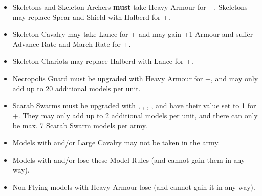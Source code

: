 \begin{itemize}
\item Skeletons and Skeleton Archers \textbf{must} take Heavy Armour for +\permodel{}. Skeletons may replace Spear and Shield with Halberd for +\permodel{}.

\item Skeleton Cavalry may take Lance for +\permodel{} and may gain +1 Armour and suffer \minuss{} Advance Rate and \minuss{} March Rate for +\permodel{}.

\item Skeleton Chariots may replace Halberd with Lance for +\permodel{}.

\item Necropolis Guard must be upgraded with Heavy Armour for +\permodel{}, and may only add up to 20 additional models per unit.

\item Scarab Swarms must be upgraded with \textbf{}, \textbf{}, \textbf{\ghoststep}, \textbf{\magicalattacks}, and have their \resurrected{} value set to 1 for +\permodel{}. They may only add up to 2 additional models per unit, and there can only be max. 7 Scarab Swarm models per army.

\item Models with \toweringpresence{} and/or Large Cavalry may not be taken in the army.

\item Models with \undergroundambush{} and/or \scout{} lose these Model Rules (and cannot gain them in any way).

\item Non-Flying models with Heavy Armour lose \lighttroops{} (and cannot gain it in any way).
\end{itemize}
